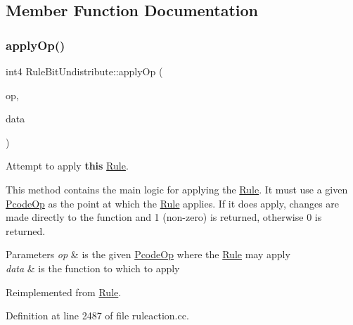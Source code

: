 \subsection{Member Function Documentation}
\mbox{\label{class_rule_bit_undistribute_a01122a111d9e7ff6d741128cb8d9999d}} 
\subsubsection{\texorpdfstring{applyOp()}{applyOp()}}
{\footnotesize\ttfamily int4 Rule\+Bit\+Undistribute\+::apply\+Op (\begin{DoxyParamCaption}\item[{\mbox{\hyperlink{class_pcode_op}{Pcode\+Op}} $\ast$}]{op,  }\item[{\mbox{\hyperlink{class_funcdata}{Funcdata}} \&}]{data }\end{DoxyParamCaption})\hspace{0.3cm}{\ttfamily [virtual]}}



Attempt to apply {\bfseries{this}} \mbox{\hyperlink{class_rule}{Rule}}. 

This method contains the main logic for applying the \mbox{\hyperlink{class_rule}{Rule}}. It must use a given \mbox{\hyperlink{class_pcode_op}{Pcode\+Op}} as the point at which the \mbox{\hyperlink{class_rule}{Rule}} applies. If it does apply, changes are made directly to the function and 1 (non-\/zero) is returned, otherwise 0 is returned. 
\begin{DoxyParams}{Parameters}
{\em op} & is the given \mbox{\hyperlink{class_pcode_op}{Pcode\+Op}} where the \mbox{\hyperlink{class_rule}{Rule}} may apply \\
\hline
{\em data} & is the function to which to apply \\
\hline
\end{DoxyParams}


Reimplemented from \mbox{\hyperlink{class_rule_a4e3e61f066670175009f60fb9dc60848}{Rule}}.



Definition at line 2487 of file ruleaction.\+cc.

